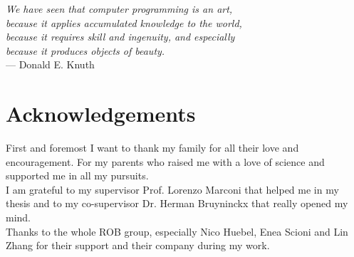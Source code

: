 

\begin{flushright}{\slshape    
We have seen that computer programming is an art, \\ 
because it applies accumulated knowledge to the world, \\ 
because it requires skill and ingenuity, and especially \\
because it produces objects of beauty.} \\ \medskip
--- {Donald E. Knuth}
\end{flushright}

\bigskip


\begingroup

\let\clearpage\relax
\let\cleardoublepage\relax
\let\cleardoublepage\relax

\chapter{Acknowledgements}

First and foremost I want to thank my family for all their love and encouragement. For my parents who raised me with a love of science and supported me in all my pursuits.\\
I am grateful to my supervisor Prof. Lorenzo Marconi that helped me in my thesis and to my co-supervisor Dr. Herman Bruyninckx that really opened my mind.\\
Thanks to the whole ROB group, especially Nico Huebel, Enea Scioni and Lin Zhang for their support and their company during my work.

\endgroup